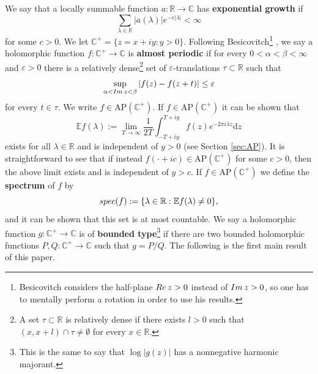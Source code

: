 \documentclass[a4paper,reqno,12pt]{amsart}
\newcommand{\E}{\mathcal{E}}
\renewcommand{\H}{\mathbb{C}^+}
\renewcommand{\r}{\mathbb{R}}
\newcommand{\cp}{\mathbb{C}} %
\newcommand{\re}{{\rm Re}\,}
\newcommand{\la}{\lambda}
\newcommand{\al}{\alpha}
\newcommand{\be}{\beta}
\newcommand{\ep}{\varepsilon}
\renewcommand{\d}{\mathrm{d}}
\newcommand{\1}{{\bf 1}}
\newcommand{\apc}{\mathrm{AP}(\H)}
\renewcommand{\E}{\mathbb{E}}
\renewcommand{\emph}[1]{{\bf #1}}
\renewcommand{\1}{{\bo 1}}
\renewcommand{\Im}{{\rm Im}\,}
\newcommand{\spec}{{\rm spec}}
\begin{document}
We say that a locally summable function $a:\r\to\cp$ has \emph{exponential growth} if
$$
\sum_{\la\in \r} |a(\la)|e^{-c|\la|}<\infty
$$
for some $c>0$. We let $\H=\{z=x+iy : y>0\}$. Following Besicovitch\footnote{Besicovitch considers the half-plane $\re z>0$ instead of $\Im z>0$, so one has to mentally perform a rotation in order to use his results.} \cite[Ch. 3]{Be}, we say a holomorphic function $f:\H\to\cp$ is \emph{almost periodic} if for every $0<\al<\be<\infty$ and $\ep>0$ there is a relatively dense\footnote{A set $\tau\subset \r$ is relatively dense if there exists $l>0$ such that $(x,x+l)\cap \tau \neq \emptyset$ for every $x\in\r$.} set of $\ep$-translations $\tau \subset \r$
such that 
$$
\sup_{\al < \Im z < \be} |f(z)-f(z+t)|\leq \ep
$$ 
for every $t\in \tau$. We write $f\in \apc$. If $f\in \apc$ it can be shown that 
$$
\E f(\la) := \lim_{T\to\infty} \frac{1}{2T}\int_{-T+iy}^{T+iy} f(z)e^{-2\pi i \la z}\d z
$$
exists for all $\la\in\r$ and is independent of $y>0$ (see Section \ref{sec:AP}). It is straightforward to see that if instead $f(\cdot +ic)\in \apc$ for some $c>0$, then the above limit exists and is independent of $y>c$. If $f\in \apc$ we define the \emph{spectrum} of $f$ by
$$
\spec(f):=\{\la\in \r : \E f(\la)\neq 0\},
$$ 
and it can be shown that this set is at most countable. We say a holomorphic function $g:\H\to\cp$ is of \emph{bounded type}\footnote{This is the same to say that $\log |g(z)|$ has a nonnegative harmonic majorant.} if there are two bounded holomorphic functions $P,Q:\H \to\cp$ such that $g=P/Q$. The following is the first main result of this paper.
\end{document}
